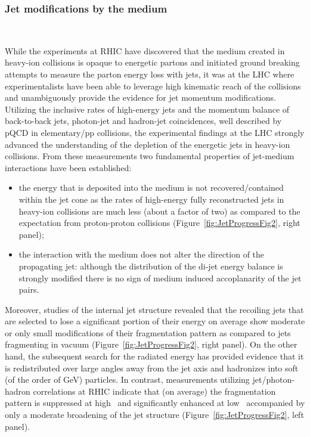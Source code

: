 \subsubsection{Jet modifications by the medium}~\label{jet-mod}
  
  While the experiments at RHIC have discovered that the medium created in heavy-ion collisions is opaque to energetic partons and initiated ground breaking attempts to measure the parton energy loss with jets, it was at the LHC where experimentalists have been able to leverage high kinematic reach of the collisions and unambiguously provide the evidence for jet momentum modifications. Utilizing the inclusive rates of high-energy jets and the momentum balance of back-to-back jets, photon-jet and hadron-jet coincidences, well described by pQCD in elementary/pp collisions, the experimental findings at the LHC strongly advanced the understanding of the depletion of the energetic jets in heavy-ion collisions. From these measurements two fundamental properties of jet-medium interactions have been established:
  \begin{itemize}
  \item the energy that is deposited into the medium is not recovered/contained within the jet cone as the rates of high-energy fully reconstructed jets in heavy-ion collisions are much less (about a factor of two) as compared to the expectation from proton-proton collisions (Figure\ \ref{fig:JetProgressFig2}, right panel);
  \item the interaction with the medium does not alter the direction of the propagating jet: although the distribution of the di-jet energy balance is strongly modified there is no sign of medium induced accoplanarity of the jet pairs.
  \end{itemize}
  Moreover, studies of the internal jet structure revealed that the recoiling jets that are 
selected to lose a significant portion of their energy on average show moderate or only small modifications of their fragmentation pattern as compared to jets fragmenting in vacuum (Figure\ \ref{fig:JetProgressFig2}, right panel). On the other hand, the subsequent search for the radiated energy has provided evidence that it is redistributed over large angles away from the jet axis and hadronizes into soft (of the order of GeV) particles. In contrast, measurements utilizing jet/photon-hadron correlations at RHIC indicate that (on average) the fragmentation pattern is suppressed at high \pT\ and significantly enhanced at low \pT\ accompanied by only a moderate broadening of the jet structure (Figure\ \ref{fig:JetProgressFig2}, left panel). 
